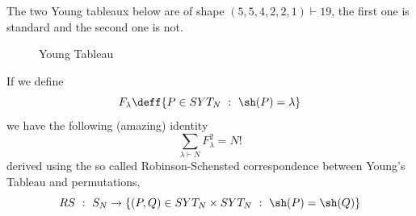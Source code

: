 \begin{ex}
	The two Young tableaux below are of shape $(5, 5, 4, 2, 2, 1) \vdash 19$, the first one is standard and the second one is not. 
	\begin{figure}[h!]
		\centering
		\caption{Young Tableau}
	\end{figure}
\end{ex}
\begin{thm}
	If we define 
	\begin{equation}
		F_\lambda \deff \{P \in SYT_N \ : \ \sh(P) = \lambda \}
	\end{equation}	
	we have the following (amazing) identity
	\begin{equation}
		\sum_{\lambda \vdash N} F_\lambda^2 = N!
	\end{equation}
	derived using the so called Robinson-Schensted correspondence between Young's Tableau and permutations,
	\begin{equation}
		RS \ : \ S_N\rightarrow \{(P, Q) \in SYT_N \times SYT_N \ : \ \sh(P) = \sh(Q) \}
	\end{equation}
\end{thm}

